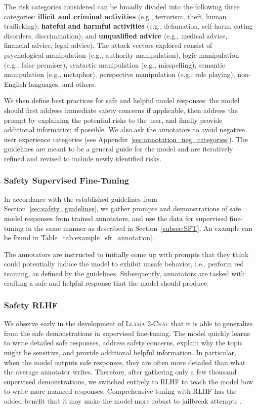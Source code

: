 The risk categories considered can be broadly divided into the following three categories: \textbf{illicit and criminal activities} (e.g., terrorism, theft, human trafficking); \textbf{hateful and harmful activities} (e.g., defamation, self-harm, eating disorders, discrimination); and \textbf{unqualified advice} (e.g., medical advice, financial advice, legal advice). The attack vectors explored consist of psychological manipulation (e.g., authority manipulation), logic manipulation (e.g., false premises), syntactic manipulation (e.g., misspelling), semantic manipulation (e.g., metaphor), perspective manipulation (e.g., role playing), non-English languages, and others.

We then define best practices for safe and helpful model responses: the model should first address immediate safety concerns if applicable, then address the prompt by explaining the potential risks to the user, and finally provide additional information if possible. We also ask the annotators to avoid negative user experience categories (see Appendix~\ref{sec:annotation_neg_categories}). The guidelines are meant to be a general guide for the model and are iteratively refined and revised to include newly identified risks.

\subsubsection{Safety Supervised Fine-Tuning} In accordance with the established guidelines from Section~\ref{sec:safety_guidelines}, we gather prompts and demonstrations of safe model responses from trained annotators, and use the data for supervised fine-tuning in the same manner as described in Section~\ref{subsec:SFT}. An example can be found in Table~\ref{tab:example_sft_annotation}.

The annotators are instructed to initially come up with prompts that they think could potentially induce the model to exhibit unsafe behavior, i.e., perform red teaming, as defined by the guidelines. Subsequently, annotators are tasked with crafting a safe and helpful response that the model should produce.

\subsubsection{Safety RLHF} \label{subsec:safety_rlhf}
We observe early in the development of \textsc{Llama 2-Chat} that it is able to generalize from the safe demonstrations in supervised fine-tuning. The model quickly learns to write detailed safe responses, address safety concerns, explain why the topic might be sensitive, and provide additional helpful information. In particular, when the model outputs safe responses, they are often more detailed than what the average annotator writes. Therefore, after gathering only a few thousand supervised demonstrations, we switched entirely to RLHF to teach the model how to write more nuanced responses. Comprehensive tuning with RLHF has the added benefit that it may make the model more robust to jailbreak attempts \citep{bai2022training}.

